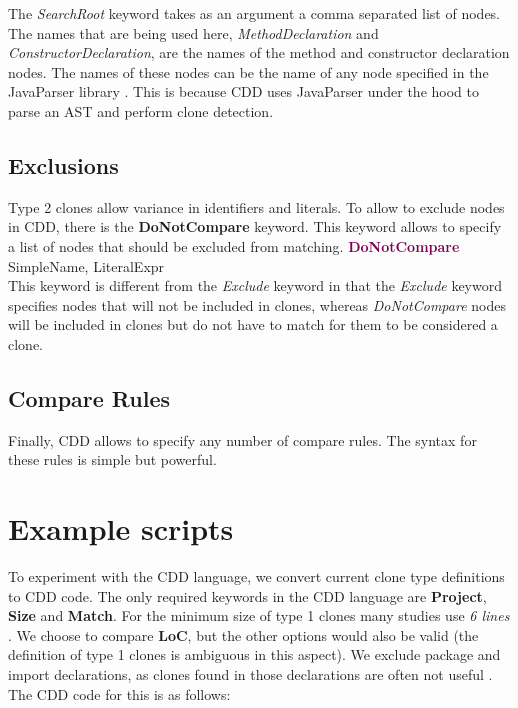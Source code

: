 \documentclass[sigplan,10pt,review,anonymous]{acmart}
\begin{document}
The \textit{SearchRoot} keyword takes as an argument a comma separated list of nodes. The names that are being used here, \textit{MethodDeclaration} and \textit{ConstructorDeclaration}, are the names of the method and constructor declaration nodes. The names of these nodes can be the name of any node specified in the JavaParser library \cite{tomassetti2017javaparser}. This is because CDD uses JavaParser under the hood to parse an AST and perform clone detection.

\subsection{Exclusions}
Type 2 clones allow variance in identifiers and literals. To allow to exclude nodes in CDD, there is the \textbf{DoNotCompare} keyword. This keyword allows to specify a list of nodes that should be excluded from matching.
\noindent\makebox[\linewidth]{\rule{\linewidth}{0.4pt}}
\noindent \textbf{\textcolor[HTML]{7F0055}{DoNotCompare}} SimpleName, LiteralExpr \\
\noindent\makebox[\linewidth]{\rule{\linewidth}{0.4pt}}
This keyword is different from the \textit{Exclude} keyword in that the \textit{Exclude} keyword specifies nodes that will not be included in clones, whereas \textit{DoNotCompare} nodes will be included in clones but do not have to match for them to be considered a clone.

\subsection{Compare Rules}
Finally, CDD allows to specify any number of compare rules. The syntax for these rules is simple but powerful. 

\section{Example scripts}
To experiment with the CDD language, we convert current clone type definitions to CDD code. The only required keywords in the CDD language are \textbf{Project}, \textbf{Size} and \textbf{Match}. For the minimum size of type 1 clones many studies use \textit{6 lines} \cite{heitlager2007practical, bruntink2004evaluation, sajnani2016sourcerercc}. We choose to compare \textbf{LoC}, but the other options would also be valid (the definition of type 1 clones is ambiguous in this aspect). We exclude package and import declarations, as clones found in those declarations are often not useful \cite{koschke2012large}. The CDD code for this is as follows:
\end{document}
